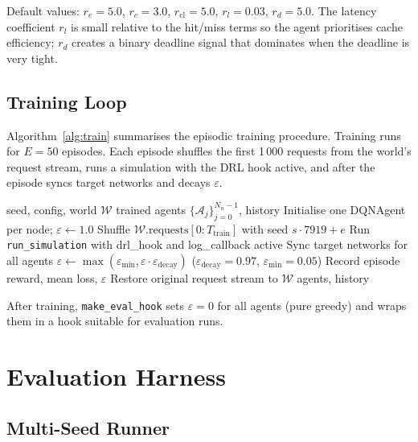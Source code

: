 \documentclass[12pt]{article}
\begin{document}
Default values: $r_e = 5.0$, $r_c = 3.0$, $r_{\text{cl}} = 5.0$, $r_l = 0.03$, $r_d = 5.0$. The latency coefficient $r_l$ is small relative to the hit/miss terms so the agent prioritises cache efficiency; $r_d$ creates a binary deadline signal that dominates when the deadline is very tight.

\subsection{Training Loop}

Algorithm~\ref{alg:train} summarises the episodic training procedure. Training runs for $E = 50$ episodes. Each episode shuffles the first 1\,000 requests from the world's request stream, runs a simulation with the DRL hook active, and after the episode syncs target networks and decays $\varepsilon$.

\begin{algorithm}[h]
\caption{DQN Training Loop (\texttt{train\_drl\_agents})}
\label{alg:train}
\begin{algorithmic}[1]
\Require seed, config, world $\mathcal{W}$
\Ensure trained agents $\{\mathcal{A}_j\}_{j=0}^{N_n - 1}$, history
\State Initialise one DQNAgent per node; $\varepsilon \leftarrow 1.0$
  \State Shuffle $\mathcal{W}.\text{requests}[0:T_{\text{train}}]$ with seed $s \cdot 7919 + e$
  \State Run \texttt{run\_simulation} with drl\_hook and log\_callback active
  \State Sync target networks for all agents
  \State $\varepsilon \leftarrow \max(\varepsilon_{\min}, \varepsilon \cdot \varepsilon_{\text{decay}})$ \quad ($\varepsilon_{\text{decay}} = 0.97$, $\varepsilon_{\min} = 0.05$)
  \State Record episode reward, mean loss, $\varepsilon$
\EndFor
\State Restore original request stream to $\mathcal{W}$
\State \Return agents, history
\end{algorithmic}
\end{algorithm}

After training, \texttt{make\_eval\_hook} sets $\varepsilon = 0$ for all agents (pure greedy) and wraps them in a hook suitable for evaluation runs.

\section{Evaluation Harness}
\label{sec:eval}

\subsection{Multi-Seed Runner}
\end{document}
